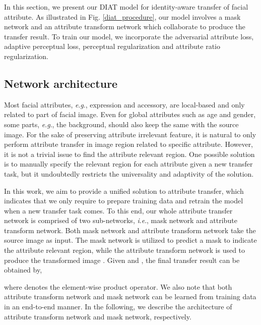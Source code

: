 \documentclass[journal]{IEEEtran}
\newcommand{\ie}{\textit{i}.\textit{e}.}
\newcommand{\eg}{\textit{e}.\textit{g}.}
\begin{document}
In this section, we present our DIAT model for identity-aware transfer of facial attribute.
As illustrated in Fig. \ref{diat_procedure}, our model involves a mask network and an attribute transform network which collaborate to produce the transfer result.
To train our model, we incorporate the adversarial attribute loss, adaptive perceptual loss, perceptual regularization and attribute ratio regularization.






\subsection{Network architecture}\label{s2_1}

Most facial attributes, \eg, expression and accessory, are local-based and only related to part of facial image.
Even for global attributes such as age and gender, some parts, \eg, the background, should also keep the same with the source image.
For the sake of preserving attribute irrelevant feature, it is natural to only perform attribute transfer in image region related to specific attribute.
However, it is not a trivial issue to find the attribute relevant region.
One possible solution is to manually specify the relevant region for each attribute given a new transfer task, but it undoubtedly restricts the universality and adaptivity of the solution.



In this work, we aim to provide a unified solution to attribute transfer, which indicates that we only require to prepare training data and retrain the model when a new transfer task comes.
To this end, our whole attribute transfer network is comprised of two sub-networks, \ie, mask network and attribute transform network.
Both mask network and attribute transform network take the source image  as input.
The mask network is utilized to predict a mask  to indicate the attribute relevant region, while the attribute transform network is used to produce the transformed image .
Given  and , the final transfer result can be obtained by,

where  denotes the element-wise product operator.
We also note that both attribute transform network and mask network can be learned from training data in an end-to-end manner.
In the following, we describe the architecture of attribute transform network and mask network, respectively.
\end{document}
